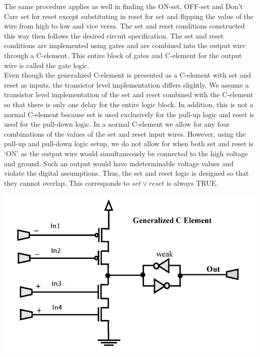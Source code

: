 \documentclass[12pt]{report}
\begin{document}
The same procedure applies as well in finding the ON-set, OFF-set and Don't Care set for reset except substituting in reset for set and flipping the value of the wire from high to low and vice versa. The set and reset conditions constructed this way then follows the desired circuit specification. The set and reset conditions are implemented using gates and are combined into the output wire through a C-element. This entire block of gates and C-element for the output wire is called the gate logic. \\ %

Even though the generalized C-element is presented as a C-element with set and reset as inputs, the transistor level implementation differs slightly. We assume a transistor level implementation of the set and reset combined with the C-element so that there is only one delay for the entire logic block. In addition, this is not a normal C-element because set is used exclusively for the pull-up logic and reset is used for the pull-down logic. In a normal C-element we allow for any four combinations of the values of the set and reset input wires. However, using the pull-up and pull-down logic setup, we do not allow for when both set and reset is `ON' as the output wire would simultaneously be connected to the high voltage and ground. Such an output would have indeterminable voltage values and violate the digital assumptions. Thus, the set and reset logic is designed so that they cannot overlap. This corresponds to $\overline{set}\vee\overline{reset} $ is always TRUE.\\
\begin{center}
\includegraphics[width=.7\textwidth]{genC}
\end{center}
\end{document}
